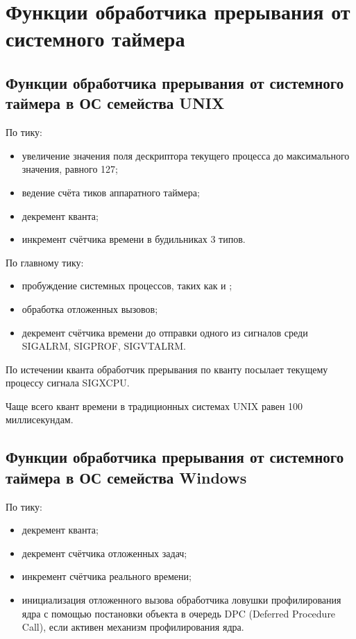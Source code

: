 \chapter{Функции обработчика прерывания от системного таймера}

\section{Функции обработчика прерывания от системного таймера в ОС
семейства UNIX}

По тику:
\begin{itemize}
  \item увеличение значения поля  дескриптора текущего процесса до максимального значения, равного 127;
  \item ведение счёта тиков аппаратного таймера;
  \item декремент кванта;
  \item инкремент счётчика времени в будильниках 3 типов.
\end{itemize}

По главному тику:
\begin{itemize}
  \item пробуждение системных процессов, таких как  и ;
  \item обработка отложенных вызовов;
  \item декремент счётчика времени до отправки одного из сигналов среди SIGALRM, SIGPROF, SIGVTALRM.
\end{itemize}

По истечении кванта обработчик прерывания по кванту посылает текущему процессу сигнала
SIGXCPU.

Чаще всего квант времени в традиционных системах UNIX равен 100 миллисекундам.

\section{Функции обработчика прерывания от системного таймера в ОС
семейства Windows}

По тику:
\begin{itemize}
  \item декремент кванта;
  \item декремент счётчика отложенных задач;
  \item инкремент счётчика реального времени;
  \item инициализация отложенного вызова обработчика ловушки профилирования ядра с помощью 
  постановки объекта в очередь DPC (Deferred Procedure Call), если активен механизм профилирования ядра.
\end{itemize}

